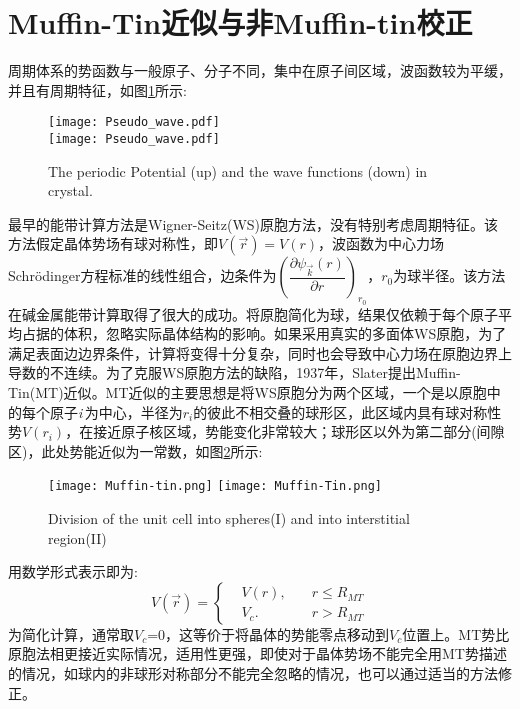 \section{Muffin-Tin近似与非Muffin-tin校正}
周期体系的势函数与一般原子、分子不同，集中在原子间区域，波函数较为平缓，并且有周期特征，如图\ref{Potential-Wave}所示:
\begin{figure}[h!]
\centering
\texttt{[image: Pseudo\_wave.pdf]}\\
\texttt{[image: Pseudo\_wave.pdf]}
\caption{\small \textrm{The periodic Potential (up) and the wave functions (down) in crystal.}}%
\label{Potential-Wave}
\end{figure}
最早的能带计算方法是Wigner-Seitz(WS)原胞方法\cite{PR43-804_1933}，没有特别考虑周期特征。该方法假定晶体势场有球对称性，即$V(\vec r)=V(r)$，波函数为中心力场Schr\"odinger方程标准的线性组合，边条件为$\left(\dfrac{\partial\psi_{\vec k}(r)}{\partial r}\right)_{r_0}$，$r_0$为球半径。该方法在碱金属能带计算取得了很大的成功。将原胞简化为球，结果仅依赖于每个原子平均占据的体积，忽略实际晶体结构的影响。如果采用真实的多面体WS原胞，为了满足表面边边界条件，计算将变得十分复杂，同时也会导致中心力场在原胞边界上导数的不连续。为了克服WS原胞方法的缺陷，1937年，Slater提出Muffin-Tin(MT)近似\cite{PR51-846_1937}。MT近似的主要思想是将WS原胞分为两个区域，一个是以原胞中的每个原子{\it i}\,为中心，半径为$r_i$的彼此不相交叠的球形区，此区域内具有球对称性势$V(r_i)$，在接近原子核区域，势能变化非常较大；球形区以外为第二部分(间隙区)，此处势能近似为一常数，如图\ref{Muffin_tin-1}所示:
\begin{figure}[h!]
\centering
\texttt{[image: Muffin-tin.png]}
\texttt{[image: Muffin-Tin.png]}
\caption{\small \textrm{Division of the unit cell into spheres(I) and into interstitial region(II)}}%
\label{Muffin_tin-1}
\end{figure}
用数学形式表示即为:
\begin{equation}
  V(\vec r)=\left\{
  \begin{aligned}
    &V(r),\quad&r\leqslant R_{MT} \\
    &V_c.&r>R_{MT}
  \end{aligned}\right.
  \label{eq:Muffin-Tin}
\end{equation}
为简化计算，通常取$V_c$=0，这等价于将晶体的势能零点移动到$V_c$位置上。MT势比原胞法相更接近实际情况，适用性更强，即使对于晶体势场不能完全用MT势描述的情况，如球内的非球形对称部分不能完全忽略的情况，也可以通过适当的方法修正。

